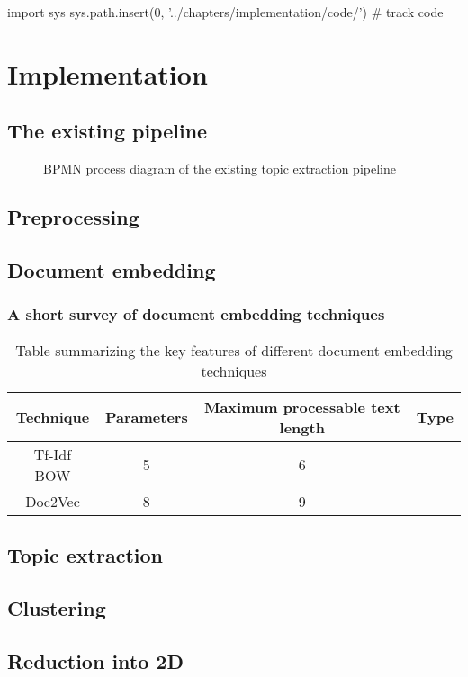 % 
\begin{pycode}
import sys
sys.path.insert(0, '../chapters/implementation/code/')
# track code

\end{pycode}

\chapter{Implementation}
\label{chap:implementation}

\section{The existing pipeline}

\begin{figure}[t]
	\centering
	\caption{\label{pic:IKON_pipeline} BPMN process diagram of the existing topic extraction pipeline}
\end{figure}

\section{Preprocessing}

\section{Document embedding}

\subsection{A short survey of document embedding techniques}

\begin{table}
	\centering
	\begin{tabular}{ c | c | c | c }
		\hline 
		Technique & Parameters & Maximum processable text length & Type \\ \hline
		Tf-Idf BOW & 5 & 6 \\ \hline
		Doc2Vec & 8 & 9 \\
		\hline
	\end{tabular}
	\caption{\label{tab:overview_doc_embedding} Table summarizing the key features of different document embedding techniques}
\end{table}

\section{Topic extraction}

\section{Clustering}

\section{Reduction into 2D}